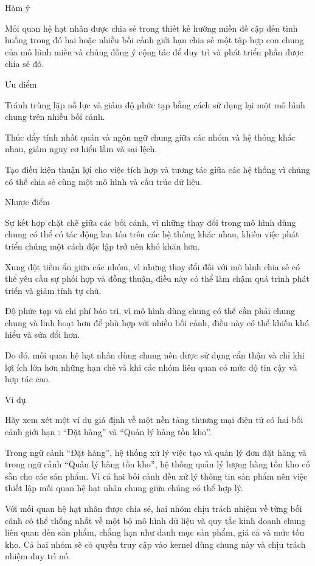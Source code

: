 Hàm ý

Mối quan hệ hạt nhân được chia sẻ trong thiết kế hướng miền đề cập đến tình huống trong đó hai hoặc nhiều bối cảnh giới hạn chia sẻ một tập hợp con chung của mô hình miền và chúng đồng ý cộng tác để duy trì và phát triển phần được chia sẻ đó.

Ưu điểm

Tránh trùng lặp nỗ lực và giảm độ phức tạp bằng cách sử dụng lại một mô hình chung trên nhiều bối cảnh.

Thúc đẩy tính nhất quán và ngôn ngữ chung giữa các nhóm và hệ thống khác nhau, giảm nguy cơ hiểu lầm và sai lệch.

Tạo điều kiện thuận lợi cho việc tích hợp và tương tác giữa các hệ thống vì chúng có thể chia sẻ cùng một mô hình và cấu trúc dữ liệu.

Nhược điểm

Sự kết hợp chặt chẽ giữa các bối cảnh, vì những thay đổi trong mô hình dùng chung có thể có tác động lan tỏa trên các hệ thống khác nhau, khiến việc phát triển chúng một cách độc lập trở nên khó khăn hơn.

Xung đột tiềm ẩn giữa các nhóm, vì những thay đổi đối với mô hình chia sẻ có thể yêu cầu sự phối hợp và đồng thuận, điều này có thể làm chậm quá trình phát triển và giảm tính tự chủ.

Độ phức tạp và chi phí bảo trì, vì mô hình dùng chung có thể cần phải chung chung và linh hoạt hơn để phù hợp với nhiều bối cảnh, điều này có thể khiến khó hiểu và sửa đổi hơn.

Do đó, mối quan hệ hạt nhân dùng chung nên được sử dụng cẩn thận và chỉ khi lợi ích lớn hơn những hạn chế và khi các nhóm liên quan có mức độ tin cậy và hợp tác cao.

Ví dụ

Hãy xem xét một ví dụ giả định về một nền tảng thương mại điện tử có hai bối cảnh giới hạn : “Đặt hàng” và “Quản lý hàng tồn kho”.

Trong ngữ cảnh “Đặt hàng”, hệ thống xử lý việc tạo và quản lý đơn đặt hàng và trong ngữ cảnh “Quản lý hàng tồn kho”, hệ thống quản lý lượng hàng tồn kho có sẵn cho các sản phẩm. Vì cả hai bối cảnh đều xử lý thông tin sản phẩm nên việc thiết lập mối quan hệ hạt nhân chung giữa chúng có thể hợp lý.

Với mối quan hệ hạt nhân được chia sẻ, hai nhóm chịu trách nhiệm về từng bối cảnh có thể thống nhất về một bộ mô hình dữ liệu và quy tắc kinh doanh chung liên quan đến sản phẩm, chẳng hạn như danh mục sản phẩm, giá cả và mức tồn kho. Cả hai nhóm sẽ có quyền truy cập vào kernel dùng chung này và chịu trách nhiệm duy trì nó.

